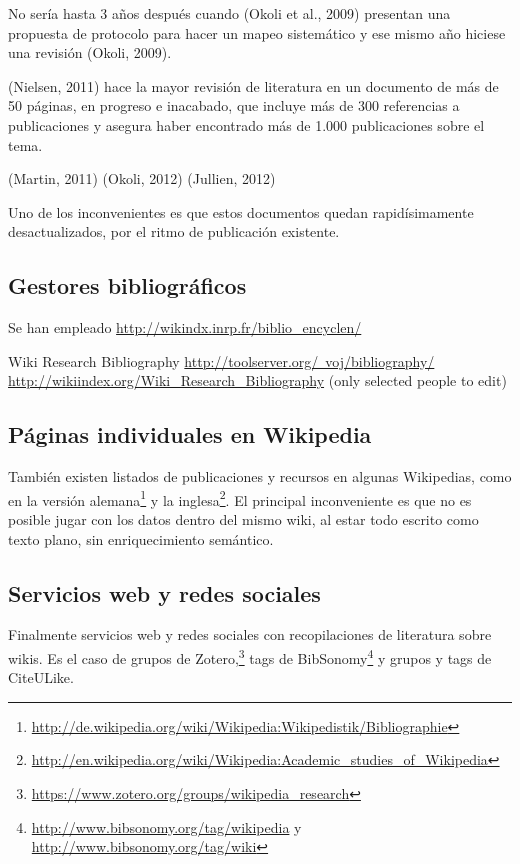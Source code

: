 \documentclass[twoside]{article}
\begin{document}
\begin{multicols}{2}
No ser\'{i}a hasta 3 a\~{n}os despu\'{e}s cuando (Okoli et al., 2009) presentan una propuesta de protocolo para hacer un mapeo sistem\'{a}tico y ese mismo a\~{n}o hiciese una revisi\'{o}n (Okoli, 2009).

(Nielsen, 2011) hace la mayor revisi\'{o}n de literatura en un documento de m\'{a}s de 50 p\'{a}ginas, en progreso e inacabado, que incluye m\'{a}s de 300 referencias a publicaciones y asegura haber encontrado m\'{a}s de 1.000 publicaciones sobre el tema.

(Martin, 2011)
(Okoli, 2012)
(Jullien, 2012)

Uno de los inconvenientes es que estos documentos quedan rapid\'{i}simamente desactualizados, por el ritmo de publicaci\'{o}n existente.

\subsection{Gestores bibliogr\'{a}ficos}
Se han empleado \href{http://wikindx.inrp.fr/biblio_encyclen/}{http://wikindx.inrp.fr/biblio\_encyclen/}

Wiki Research Bibliography
\href{http://toolserver.org/~voj/bibliography/}{http://toolserver.org/~voj/bibliography/}
\href{http://wikiindex.org/Wiki_Research_Bibliography}{http://wikiindex.org/Wiki\_Research\_Bibliography}
(only selected people to edit)

\subsection{P\'{a}ginas individuales en Wikipedia}
Tambi\'{e}n existen listados de publicaciones y recursos en algunas Wikipedias, como en la versi\'{o}n alemana\footnote{\href{http://de.wikipedia.org/wiki/Wikipedia:Wikipedistik/Bibliographie}{http://de.wikipedia.org/wiki/Wikipedia:Wikipedistik/Bibliographie}} y la inglesa\footnote{\href{http://en.wikipedia.org/wiki/Wikipedia:Academic_studies_of_Wikipedia}{http://en.wikipedia.org/wiki/Wikipedia:Academic\_studies\_of\_Wikipedia}}. El principal inconveniente es que no es posible jugar con los datos dentro del mismo wiki, al estar todo escrito como texto plano, sin enriquecimiento sem\'{a}ntico.

\subsection{Servicios web y redes sociales}
Finalmente servicios web y redes sociales con recopilaciones de literatura sobre wikis. Es el caso de grupos de Zotero,\footnote{\href{https://www.zotero.org/groups/wikipedia_research}{https://www.zotero.org/groups/wikipedia\_research}} tags de BibSonomy\footnote{\href{http://www.bibsonomy.org/tag/wikipedia}{http://www.bibsonomy.org/tag/wikipedia} y \href{http://www.bibsonomy.org/tag/wiki}{http://www.bibsonomy.org/tag/wiki}} y grupos y tags de CiteULike.


\end{multicols}
\end{document}
